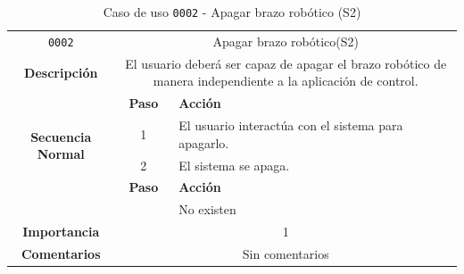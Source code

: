 \begin{table}[H]
    \centering
    \begin{tabularx}{\textwidth}{|c|c|X|}
        \cline{1-3}
        \texttt{0002}                              & \multicolumn{2}{c|}{Apagar brazo robótico(\ac{S2})}                    \\ \cline{1-3}
        \textbf{Descripción}                       & \multicolumn{2}{m{13cm}|}{El usuario deberá ser capaz de apagar el brazo robótico de manera independiente a la aplicación de control.}
        \\ \cline{1-3}
        \multirow{4}{*}{\textbf{Secuencia Normal}} & \textbf{Paso}  & \textbf{Acción}
        \\ \cline{2-3}                             &   1            & El usuario interactúa con el sistema para apagarlo.
        \\ \cline{2-3}                             &   2            & El sistema se apaga.
        \\ \cline{1-3}
        \multirow{2}{*}{\textbf{Excepciones}}      & \textbf{Paso}                                                                                                                                        & \textbf{Acción}
        \\ \cline{2-3}                    &     & No existen
        \\ \cline{1-3}
        \textbf{Importancia}                       & \multicolumn{2}{c|}{1}                                                                                                                                                 \\ \cline{1-3}
        \textbf{Comentarios}                       & \multicolumn{2}{c|}{Sin comentarios}                                                                                                                                   \\ \cline{1-3}
    \end{tabularx}
    \caption{Caso de uso \texttt{0002} - Apagar brazo robótico (\ac{S2})}
    \label{tab:CU0002}
    \label{tab:caso_de_uso_apagar_brazo_robotico}
\end{table}


